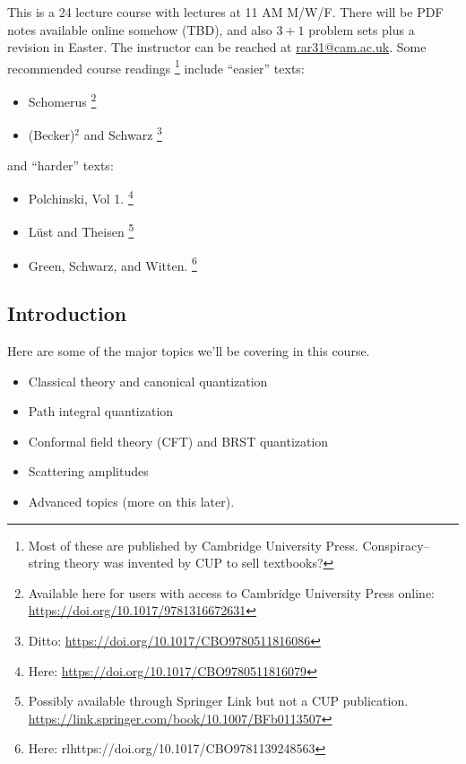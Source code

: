 \begin{note}
    This is a 24 lecture course with lectures at 11 AM M/W/F. There will be PDF notes available online somehow (TBD), and also $3+1$ problem sets plus a revision in Easter. The instructor can be reached at \url{rar31@cam.ac.uk}. Some recommended course readings%
        \footnote{Most of these are published by Cambridge University Press. Conspiracy-- string theory was invented by CUP to sell textbooks?
        }
    include ``easier'' texts:
    \begin{itemize}
        \item Schomerus%
            \footnote{Available here for users with access to Cambridge University Press online: \url{https://doi.org/10.1017/9781316672631}}
        \item (Becker)${}^2$ and Schwarz%
            \footnote{Ditto: \url{https://doi.org/10.1017/CBO9780511816086}}
    \end{itemize}
    and ``harder'' texts:
    \begin{itemize}
        \item Polchinski, Vol 1.%
            \footnote{Here: \url{https://doi.org/10.1017/CBO9780511816079}}
        \item L\"ust and Theisen%
            \footnote{Possibly available through Springer Link but not a CUP publication. \url{https://link.springer.com/book/10.1007/BFb0113507}}
        \item Green, Schwarz, and Witten.%
            \footnote{Here: rl{https://doi.org/10.1017/CBO9781139248563}}
    \end{itemize}
\end{note}

\subsection*{Introduction} Here are some of the major topics we'll be covering in this course.
\begin{itemize}
    \item Classical theory and canonical quantization
    \item Path integral quantization
    \item Conformal field theory (CFT) and BRST quantization
    \item Scattering amplitudes
    \item Advanced topics (more on this later).
\end{itemize}


